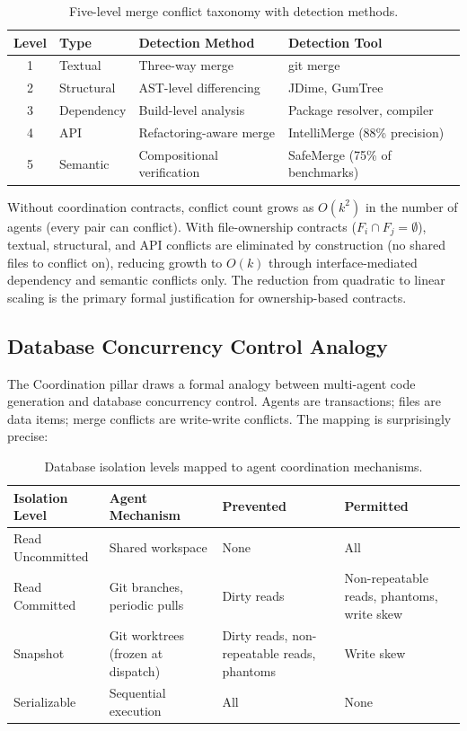 \documentclass[11pt, a4paper]{googledeepmind}
\begin{document}
\begin{table}[ht]
\centering
\caption{Five-level merge conflict taxonomy with detection methods.}
\label{tab:conflict-taxonomy}
\begin{tabular}{clll}
\toprule
\textbf{Level} & \textbf{Type} & \textbf{Detection Method} & \textbf{Detection Tool} \\
\midrule
1 & Textual & Three-way merge & git merge \\
2 & Structural & AST-level differencing & JDime, GumTree \\
3 & Dependency & Build-level analysis & Package resolver, compiler \\
4 & API & Refactoring-aware merge & IntelliMerge (88\% precision) \\
5 & Semantic & Compositional verification & SafeMerge (75\% of benchmarks) \\
\bottomrule
\end{tabular}
\end{table}

Without coordination contracts, conflict count grows as $O(k^2)$ in the number of agents (every pair can conflict). With file-ownership contracts ($F_i \cap F_j = \emptyset$), textual, structural, and API conflicts are eliminated by construction (no shared files to conflict on), reducing growth to $O(k)$ through interface-mediated dependency and semantic conflicts only. The reduction from quadratic to linear scaling is the primary formal justification for ownership-based contracts.

\subsection{Database Concurrency Control Analogy}

The Coordination pillar draws a formal analogy between multi-agent code generation and database concurrency control. Agents are transactions; files are data items; merge conflicts are write-write conflicts. The mapping is surprisingly precise:

\begin{table}[ht]
\centering
\caption{Database isolation levels mapped to agent coordination mechanisms.}
\label{tab:isolation-levels}
\footnotesize
\begin{tabular}{p{2.2cm}p{3.2cm}p{3cm}p{3cm}}
\toprule
\textbf{Isolation Level} & \textbf{Agent Mechanism} & \textbf{Prevented} & \textbf{Permitted} \\
\midrule
Read Uncommitted & Shared workspace & None & All \\
Read Committed & Git branches, periodic pulls & Dirty reads & Non-repeatable reads, phantoms, write skew \\
Snapshot & Git worktrees (frozen at dispatch) & Dirty reads, non-repeatable reads, phantoms & Write skew \\
Serializable & Sequential execution & All & None \\
\bottomrule
\end{tabular}
\end{table}
\end{document}
